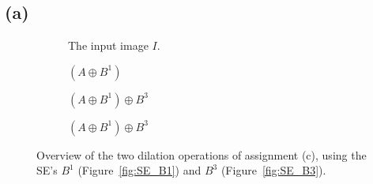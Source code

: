 \documentclass{article}
\begin{document}
\subsection*{(a)}
\begin{figure}[H]
     \centering
     \begin{subfigure}[b]{0.75\textwidth}
         \centering
         
         \caption{The input image $I$.}
         \label{fig:wirebondmask-image}
     \end{subfigure}
     \newline
     \hfill
     \begin{subfigure}[b]{0.33\textwidth}
         \centering
         
         \caption{$(A \oplus B^1)$}
         \label{fig:Bcross}
     \end{subfigure}
     \hfill
     \begin{subfigure}[b]{0.33\textwidth}
         \centering
         
         \caption{$(A \oplus B^1) \oplus B^3$}
         \label{fig:Bsquare}
     \end{subfigure}
     \hfill
     \begin{subfigure}[b]{0.33\textwidth}
         \centering
         
         \caption{$(A \oplus B^1) \oplus B^3$}
         \label{fig:Bbigsquare}
     \end{subfigure}
     
    \caption{Overview of the two dilation operations of assignment (c), using the SE's $B^1$ (Figure~\ref{fig:SE_B1}) and $B^3$ (Figure~\ref{fig:SE_B3}).}
    \label{fig:structuring-elements-overview}
\end{figure}
\end{document}
